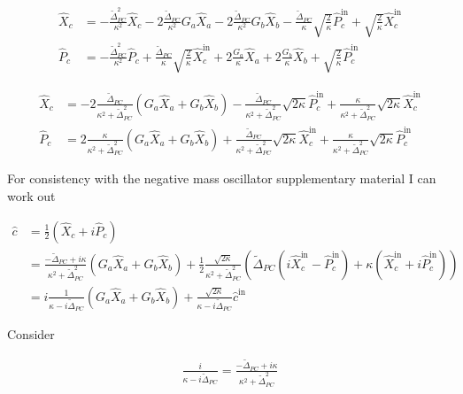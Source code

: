 \documentclass[12pt]{article}
\begin{document}
\begin{align}
\hat{X}_c & = -\frac{\tilde{\Delta}_{PC}^2}{\kappa^2} \hat{X}_c - 2\frac{\tilde{\Delta}_{PC}}{\kappa^2}G_a \hat{X}_a - 2\frac{\tilde{\Delta}_{PC}}{\kappa^2}G_b \hat{X}_b  - \frac{\tilde{\Delta}_{PC}}{\kappa} \sqrt{\frac{2}{\kappa}}\hat{P}_c^{\text{in}} + \sqrt{\frac{2}{\kappa}}\hat{X}_c^{\text{in}}\\
\hat{P}_c &= - \frac{\tilde{\Delta}_{PC}^2}{\kappa^2} \hat{P}_c + \frac{\tilde{\Delta}_{PC}}{\kappa}\sqrt{\frac{2}{\kappa}}\hat{X}_c^{\text{in}} + 2\frac{G_a}{\kappa}\hat{X}_a + 2\frac{G_b}{\kappa} \hat{X}_b + \sqrt{\frac{2}{\kappa}}\hat{P}_c^{\text{in}}
\end{align}

\begin{align}
\hat{X}_c &= -2 \frac{\tilde{\Delta}_{PC}}{\kappa^2+\tilde{\Delta}_{PC}^2} \left(G_a \hat{X}_a + G_b \hat{X}_b\right) - \frac{\tilde{\Delta}_{PC}}{\kappa^2 + \tilde{\Delta}_{PC}^2} \sqrt{2\kappa} \hat{P}_c^{\text{in}} + \frac{\kappa}{\kappa^2+\tilde{\Delta}_{PC}^2} \sqrt{2\kappa} \hat{X}_c^{\text{in}}\\
\hat{P}_c &= 2 \frac{\kappa}{\kappa^2+\tilde{\Delta}_{PC}^2} \left(G_a \hat{X}_a + G_b \hat{X}_b\right) + \frac{\tilde{\Delta}_{PC}}{\kappa^2 + \tilde{\Delta}_{PC}^2} \sqrt{2\kappa} \hat{X}_c^{\text{in}} + \frac{\kappa}{\kappa^2+\tilde{\Delta}_{PC}^2} \sqrt{2\kappa} \hat{P}_c^{\text{in}}
\end{align}

For consistency with the negative mass oscillator supplementary material I can work out

\begin{align}
\hat{c} &= \frac{1}{2}\left(\hat{X}_c + i\hat{P}_c\right)\\
&= \frac{-\tilde{\Delta}_{PC}+i\kappa}{\kappa^2 + \tilde{\Delta}_{PC}^2}\left(G_a\hat{X}_a + G_b \hat{X}_b\right) + \frac{1}{2}\frac{\sqrt{2\kappa}}{\kappa^2 + \tilde{\Delta}_{PC}^2} \left(\tilde{\Delta}_{PC}(i \hat{X}_c^{\text{in}} - \hat{P}_c^{\text{in}}) + \kappa (\hat{X}_c^{\text{in}} +i \hat{P}_c^{\text{in}})\right)\\
&= i \frac{1}{\kappa - i\tilde{\Delta}_{PC}}\left(G_a \hat{X}_a + G_b \hat{X}_b\right) + \frac{\sqrt{2\kappa}}{\kappa - i\tilde{\Delta}_{PC}} \hat{c}^{\text{in}}
\end{align}

Consider

\begin{align}
\frac{i}{\kappa - i \tilde{\Delta}_{PC}} = \frac{-\tilde{\Delta}_{PC} + i\kappa}{\kappa^2 + \tilde{\Delta}_{PC}^2}
\end{align}
\end{document}
